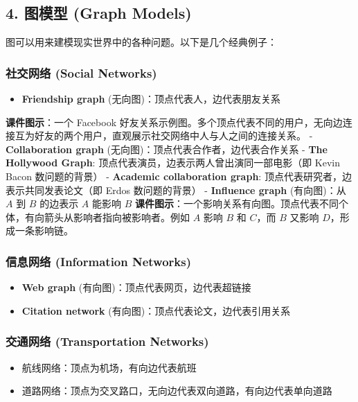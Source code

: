 \documentclass[10pt,a4paper,openany]{ctexbook}
\theoremstyle{definition}
\theoremstyle{remark}
\renewenvironment{quote}
  {\list{}{\leftmargin=1em\rightmargin=0pt\topsep=0.5pt\partopsep=0pt}\item[]}
  {\endlist}
\begin{document}
\subsection{4. 图模型 (Graph Models)}

图可以用来建模现实世界中的各种问题。以下是几个经典例子：
\subsubsection{社交网络 (Social Networks)}

\begin{itemize}
\item \textbf{Friendship graph} (无向图)：顶点代表人，边代表朋友关系
\end{itemize}

\begin{quote}
\textbf{课件图示}：一个 Facebook 好友关系示例图。多个顶点代表不同的用户，无向边连接互为好友的两个用户，直观展示社交网络中人与人之间的连接关系。
- \textbf{Collaboration graph} (无向图)：顶点代表合作者，边代表合作关系
- \textbf{The Hollywood Graph}: 顶点代表演员，边表示两人曾出演同一部电影（即 Kevin Bacon 数问题的背景）
- \textbf{Academic collaboration graph}: 顶点代表研究者，边表示共同发表论文（即 Erdos 数问题的背景）
- \textbf{Influence graph} (有向图)：从 $A$ 到 $B$ 的边表示 $A$ 能影响 $B$
\textbf{课件图示}：一个影响关系有向图。顶点代表不同个体，有向箭头从影响者指向被影响者。例如 $A$ 影响 $B$ 和 $C$，而 $B$ 又影响 $D$，形成一条影响链。

\end{quote}

\subsubsection{信息网络 (Information Networks)}

\begin{itemize}
\item \textbf{Web graph} (有向图)：顶点代表网页，边代表超链接
\item \textbf{Citation network} (有向图)：顶点代表论文，边代表引用关系

\end{itemize}

\subsubsection{交通网络 (Transportation Networks)}

\begin{itemize}
\item 航线网络：顶点为机场，有向边代表航班
\item 道路网络：顶点为交叉路口，无向边代表双向道路，有向边代表单向道路

\end{itemize}
\end{document}
